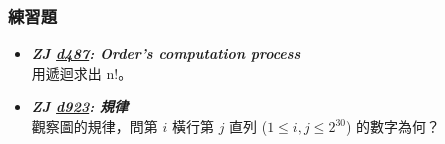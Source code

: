 \subsubsection*{練習題}
\begin{itemize}[label={\Checkmark}]
\item \textbf{\textit{ZJ \href{http://zerojudge.tw/ShowProblem?problemid=d487}{d487}: Order's computation process}}\\
用遞迴求出 n!。
\item \textbf{\textit{ZJ \href{http://zerojudge.tw/ShowProblem?problemid=d923}{d923}: 規律}}\\
觀察圖的規律，問第 $i$ 橫行第 $j$ 直列 ($1\leq{i,j}\leq{2^{30}}$) 的數字為何？
\end{itemize}